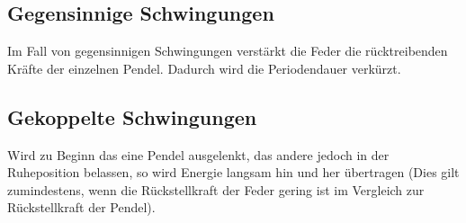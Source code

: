     \subsection{Gegensinnige Schwingungen}
        Im Fall von gegensinnigen Schwingungen verstärkt die Feder die rücktreibenden Kräfte
        der einzelnen Pendel. Dadurch wird die Periodendauer verkürzt. 
    \subsection{Gekoppelte Schwingungen}
        Wird zu Beginn das eine Pendel ausgelenkt, das andere jedoch in der Ruheposition 
        belassen, so wird Energie langsam hin und her übertragen (Dies gilt zumindestens, wenn die
        Rückstellkraft der Feder gering ist im Vergleich zur Rückstellkraft der Pendel).
